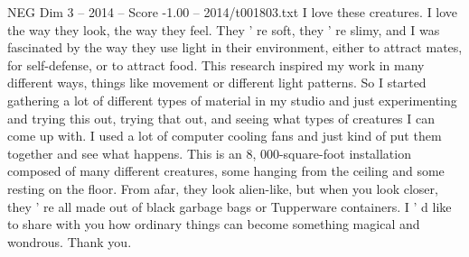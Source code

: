 \begin{textsample}{NEG Dim 3 – 2014 – Score -1.00 – 2014/t001803.txt}
I love these creatures.
I love the way they look, the way they feel.
They ' re soft, they ' re slimy, and I was fascinated by the way they use light in their environment, either to attract mates, for self-defense, or to attract food.
This research inspired my work in many different ways, things like movement or different light patterns.
So I started gathering a lot of different types of material in my studio and just experimenting and trying this out, trying that out, and seeing what types of creatures I can come up with.
I used a lot of computer cooling fans and just kind of put them together and see what happens.
This is an 8, 000-square-foot installation composed of many different creatures, some hanging from the ceiling and some resting on the floor.
From afar, they look alien-like, but when you look closer, they ' re all made out of black garbage bags or Tupperware containers.
I ' d like to share with you how ordinary things can become something magical and wondrous.
Thank you.

\end{textsample}
